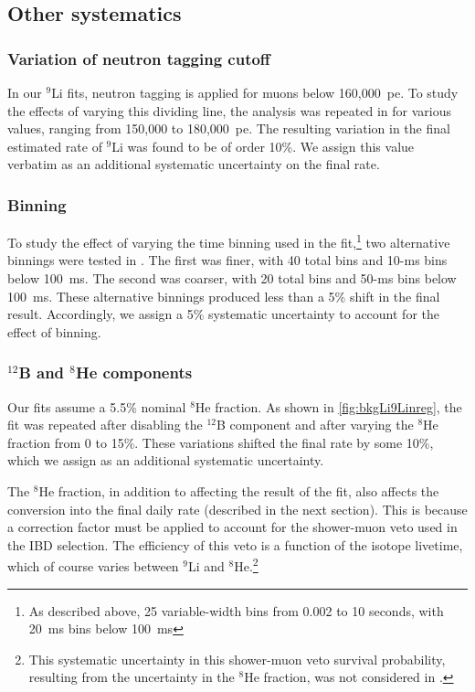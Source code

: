 \documentclass[../thesis.tex]{subfiles}
\begin{document}

\subsection{Other systematics}
\label{sec:bkgLi9FitSyst}

\subsubsection{Variation of neutron tagging cutoff}
\label{sec:bkgLi9NeuTagCutoff}

In our $^9$Li fits, neutron tagging is applied for muons below 160,000~pe. To study the effects of varying this dividing line, the analysis was repeated in \cite{ChrisLi9} for various values, ranging from 150,000 to 180,000~pe. The resulting variation in the final estimated rate of $^9$Li was found to be of order 10\%. We assign this value verbatim as an additional systematic uncertainty on the final rate.

\subsubsection{Binning}
\label{sec:bkgLi9Binning}

To study the effect of varying the time binning used in the fit,\footnote{As described above, 25 variable-width bins from 0.002 to 10 seconds, with 20~ms bins below 100~ms} two alternative binnings were tested in \cite{ChrisLi9}. The first was finer, with 40 total bins and 10-ms bins below 100~ms. The second was coarser, with 20 total bins and 50-ms bins below 100~ms. These alternative binnings produced less than a 5\% shift in the final result. Accordingly, we assign a 5\% systematic uncertainty to account for the effect of binning.

\subsubsection{$^{12}$B and $^8$He components}
\label{sec:bkgLi9B12unc}

Our fits assume a 5.5\% nominal $^8$He fraction. As shown in \autoref{fig:bkgLi9Linreg}, the fit was repeated after disabling the $^{12}$B component and after varying the $^8$He fraction from 0 to 15\%. These variations shifted the final rate by some 10\%, which we assign as an additional systematic uncertainty.

The $^8$He fraction, in addition to affecting the result of the fit, also affects the conversion into the final daily rate (described in the next section). This is because a correction factor must be applied to account for the shower-muon veto used in the IBD selection. The efficiency of this veto is a function of the isotope livetime, which of course varies between $^9$Li and $^8$He.\footnote{This systematic uncertainty in this shower-muon veto survival probability, resulting from the uncertainty in the $^8$He fraction, was not considered in \cite{ChrisLi9}.}
\end{document}
